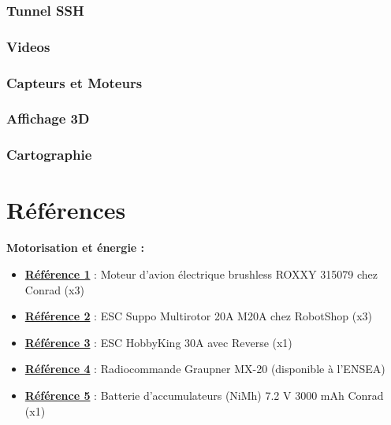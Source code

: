 \documentclass[a4paper,11pt]{report}
\begin{document}
		\subsection{Tunnel SSH}
		\subsection{Videos}
		\subsection{Capteurs et Moteurs}
		\subsection{Affichage 3D}
		\subsection{Cartographie}
			\label{subsec:Cartographie}

\chapter{Références}

				\textbf{Motorisation et énergie :}
				\begin{itemize}
							\item \textbf{\href{http://www.conrad.fr/ce/fr/product/231891/Moteur-davion-lectrique-brushless-ROXXY-315079?ref=searchDetail}{Référence 1}} : Moteur d'avion électrique brushless ROXXY 315079 chez Conrad (x3)
							\item \textbf{\href{https://www.robotshop.com/eu/fr/esc-multirotor-20a-m20a.html}{Référence 2}} : ESC Suppo Multirotor 20A M20A chez RobotShop (x3)
							\item \textbf{\href{https://hobbyking.com/fr_fr/hobbykingr-tm-brushless-car-esc-30a-w-reverse.html}{Référence 3}} : ESC HobbyKing 30A avec Reverse (x1)
							\item \textbf{\href{https://www.topmodel.fr/product-detail-18656-graupner-mx-20-hott-12160?lang=fr}{Référence 4}} : Radiocommande Graupner MX-20 (disponible à l'ENSEA)
							\item \textbf{\href{http://www.conrad.fr/ce/fr/product/206028/Batterie-daccumulateurs-NiMh-72-V-3000-mAh-Conrad-energy-206028-stick-fiche-Tamiya-mle?ref=searchDetail}{Référence 5}} : Batterie d'accumulateurs (NiMh) 7.2 V 3000 mAh Conrad (x1)
				\end{itemize}
\end{document}
